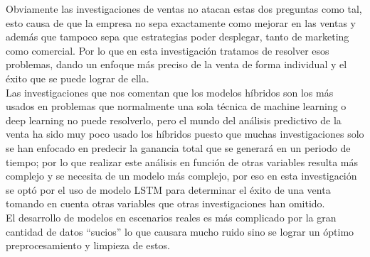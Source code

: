 \documentclass[conference]{IEEEtran}
\begin{document}
Obviamente las investigaciones de ventas no atacan estas dos preguntas como tal, esto causa de que la empresa no sepa exactamente como mejorar en las ventas y además que tampoco sepa que estrategias poder desplegar, tanto de marketing como comercial. Por lo que en esta investigación tratamos de resolver esos problemas, dando un enfoque más preciso de la venta de forma individual y el éxito que se puede lograr de ella.\\
Las investigaciones \cite{b3}\cite{b4} que nos comentan que los modelos híbridos son los más usados en problemas que normalmente una sola técnica de machine learning o deep learning no puede resolverlo, pero el mundo del análisis predictivo de la venta ha sido muy poco usado los híbridos puesto que muchas investigaciones solo se han enfocado en predecir la ganancia total que se generará en un periodo de tiempo; por lo que realizar este análisis en función de otras variables resulta más complejo y se necesita de un modelo más complejo, por eso en esta investigación se optó por el uso de modelo LSTM para determinar el éxito de una venta tomando en cuenta otras variables que otras investigaciones han omitido.\\
El desarrollo de modelos en escenarios reales es más complicado por la gran cantidad de datos “sucios” lo que causara mucho ruido sino se lograr un óptimo preprocesamiento y limpieza de estos.
\end{document}
